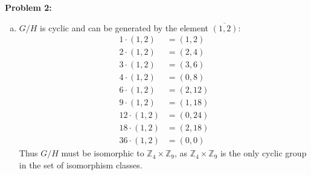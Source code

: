 \documentclass[12pt, letterpaper]{article}
\newenvironment{problem}
    [1]
    {\noindent \textbf{Problem #1:}}
    {\vspace{3mm}}
\begin{document}
\begin{problem}{2}
\begin{enumerate}[(a)]
        \item $G/H$ is cyclic and can be generated by the element $\overline{(1, 2)}$:
        \begin{align*}
            1 \cdot (1, 2) &= (1, 2)\\
            2 \cdot (1, 2) &= (2, 4)\\
            3 \cdot (1, 2) &= (3, 6)\\
            4 \cdot (1, 2) &= (0, 8)\\
            6 \cdot (1, 2) &= (2, 12)\\
            9 \cdot (1, 2) &= (1, 18)\\
            12 \cdot (1, 2) &= (0, 24)\\
            18 \cdot (1, 2) &= (2, 18)\\
            36 \cdot (1, 2) &= (0, 0)
        \end{align*}
        Thus $G/H$ must be isomorphic to $\mathbb{Z}_4 \times \mathbb{Z}_9$, as $\mathbb{Z}_4 \times 
        \mathbb{Z}_9$ is the only cyclic group in the set of isomorphism classes.
    \end{enumerate}
\end{problem}
\end{document}
